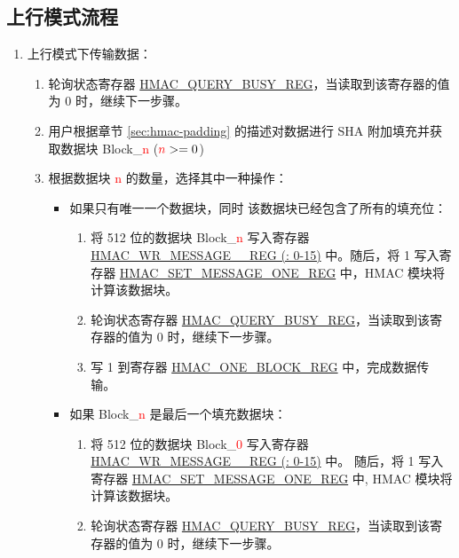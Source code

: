 \documentclass[main\_\_CN.tex]{subfiles}
\begin{document}
\subsection{上行模式流程}
\label{sec:hmac-upstream-process}

\begin{enumerate}
    \item 上行模式下传输数据：
    \begin{enumerate}
        \item 轮询状态寄存器 \hyperref[regdesc:HMACQUERYBUSYREG]{HMAC\_QUERY\_BUSY\_REG}，当读取到该寄存器的值为 0 时，继续下一步骤。
        \item 用户根据章节 \ref{sec:hmac-padding} 的描述对数据进行 SHA 附加填充并获取数据块 Block\_\textcolor{red}{n} ($\textcolor{red}{n}>=0$)
        \item 根据数据块 \textcolor{red}{n} 的数量，选择其中一种操作：
        \begin{itemize}
            \item 如果只有唯一一个数据块，同时 该数据块已经包含了所有的填充位：
            \begin{enumerate}
                \item 将 512 位的数据块 Block\_\textcolor{red}{n} 写入寄存器  \hyperref[regdesc:HMACWRMESSAGENREG]
                {HMAC\_WR\_MESSAGE\_\_REG (: 0-15)} 中。随后，将 1 写入寄存器 \hyperref[regdesc:HMACSETMESSAGEONEREG]{HMAC\_SET\_MESSAGE\_ONE\_REG} 中，HMAC 模块将计算该数据块。
                \item 轮询状态寄存器 \hyperref[regdesc:HMACQUERYBUSYREG]{HMAC\_QUERY\_BUSY\_REG}，当读取到该寄存器的值为 0 时，继续下一步骤。
                \item 写 1 到寄存器 \hyperref[regdesc:HMACONEBLOCKREG]{HMAC\_ONE\_BLOCK\_REG} 中，完成数据传输。
            \end{enumerate}
            \item 如果 Block\_\textcolor{red}{n} 是最后一个填充数据块：
            \begin{enumerate}
                \item 将 512 位的数据块 Block\_\textcolor{red}{0} 写入寄存器 \hyperref[regdesc:HMACWRMESSAGENREG]
                {HMAC\_WR\_MESSAGE\_\_REG (: 0-15)} 中。 随后，将 1 写入寄存器 \hyperref[regdesc:HMACSETMESSAGEONEREG]{HMAC\_SET\_MESSAGE\_ONE\_REG} 中, HMAC 模块将计算该数据块。
                \item 轮询状态寄存器 \hyperref[regdesc:HMACQUERYBUSYREG]{HMAC\_QUERY\_BUSY\_REG}，当读取到该寄存器的值为 0 时，继续下一步骤。

\end{enumerate}
\end{itemize}
\end{enumerate}
\end{enumerate}
\end{document}
